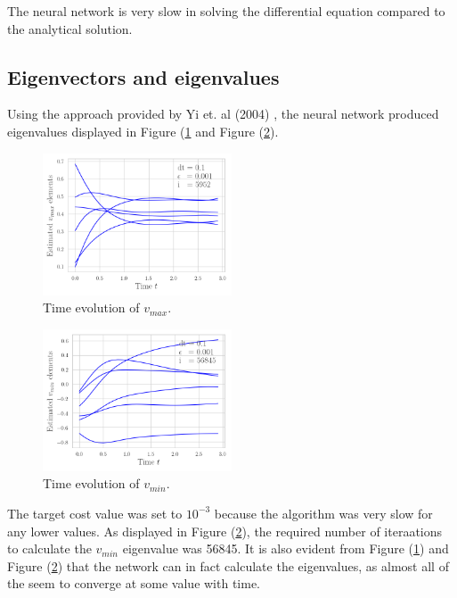 \documentclass[a4paper,11pt,twocolumn]{article}
\begin{document}
The neural network is very slow in solving the differential equation compared to the analytical solution.
\subsection{Eigenvectors and eigenvalues}

Using the approach provided by Yi et. al (2004) \cite{yi}, the neural network produced eigenvalues displayed in Figure (\ref{fig:eigenval1} and Figure (\ref{fig:eigenval2}).

\begin{figure}[h]
	\centering 
	\includegraphics[width=0.5\textwidth]{figures/eigenvalues1}
	\caption{Time evolution of $v_{max}$.}
	\label{fig:eigenval1}
\end{figure}

\begin{figure}[h]
	\centering 
	\includegraphics[width=0.5\textwidth]{figures/eigenvalues2}
	\caption{Time evolution of $v_{min}$.}
	\label{fig:eigenval2}
\end{figure}

The target cost value was set to $10^{-3}$ because the algorithm was very slow for any lower values. As displayed in Figure (\ref{fig:eigenval2}), the required number of iteraations to calculate the $v_{min}$ eigenvalue was 56845. It is also evident from Figure (\ref{fig:eigenval1}) and Figure (\ref{fig:eigenval2}) that the network can in fact calculate the eigenvalues, as almost all of the seem to converge at some value with time. 
\end{document}
